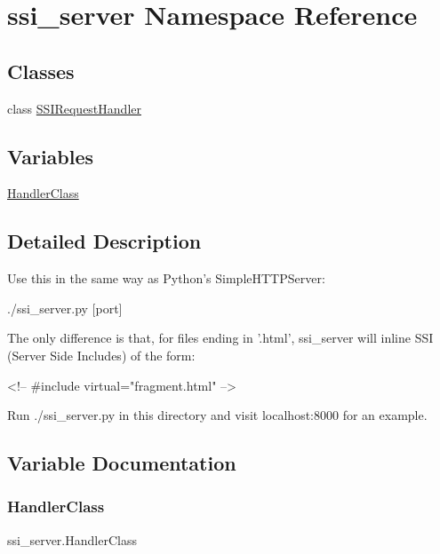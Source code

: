 \hypertarget{namespacessi__server}{}\section{ssi\+\_\+server Namespace Reference}
\label{namespacessi__server}
\subsection*{Classes}
\begin{DoxyCompactItemize}
\item 
class \hyperlink{classssi__server_1_1SSIRequestHandler}{S\+S\+I\+Request\+Handler}
\end{DoxyCompactItemize}
\subsection*{Variables}
\begin{DoxyCompactItemize}
\item 
\hyperlink{namespacessi__server_a22ffdf7df37fd789d621c214e509fcea}{Handler\+Class}
\end{DoxyCompactItemize}


\subsection{Detailed Description}
\begin{DoxyVerb}Use this in the same way as Python's SimpleHTTPServer:

./ssi_server.py [port]

The only difference is that, for files ending in '.html', ssi_server will
inline SSI (Server Side Includes) of the form:

<!-- #include virtual="fragment.html" -->

Run ./ssi_server.py in this directory and visit localhost:8000 for an example.
\end{DoxyVerb}
 

\subsection{Variable Documentation}
\mbox{\label{namespacessi__server_a22ffdf7df37fd789d621c214e509fcea}} 
\subsubsection{\texorpdfstring{Handler\+Class}{HandlerClass}}
{\footnotesize\ttfamily ssi\+\_\+server.\+Handler\+Class}

